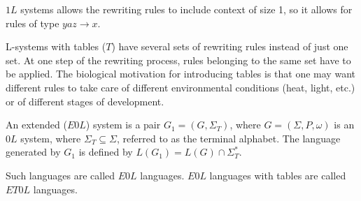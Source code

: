$1L$ systems allows the rewriting rules to include context of size 1, so it allows for rules of type $yaz\rightarrow x$.

L-systems with tables ($T$) have several sets of rewriting rules instead of just one set. At one step of the rewriting process, rules belonging to the same set have to be applied. The biological motivation for introducing tables is that one may want different rules to take care of different environmental conditions (heat, light, etc.) or of different stages of development.

\begin{definition}
An extended ($E0L$) system is a pair $G_1 = (G, \Sigma_T)$, where $G = (\Sigma, P, \omega)$ is an $0L$ system, where $\Sigma_T \subseteq \Sigma$, referred to as the terminal alphabet. The language generated by $G_1$ is defined by $L(G_1) = L(G)\cap \Sigma_T^*$.
\end{definition}

Such languages are called $E0L$ languages. $E0L$ languages with tables are called $ET0L$ languages.


